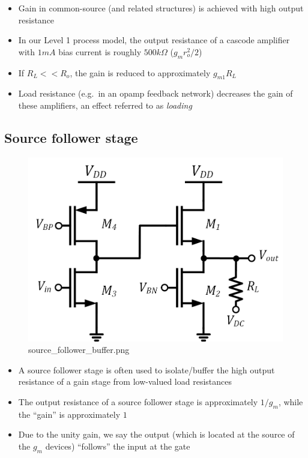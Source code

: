 \documentclass[11pt]{article}
\begin{document}
    \begin{itemize}
\item
  Gain in common-source (and related structures) is achieved with high
  output resistance
\item
  In our Level 1 process model, the output resistance of a cascode
  amplifier with \(1mA\) bias current is roughly \(500k\Omega\)
  (\(g_m r_o^2/2\))
\item
  If \(R_L << R_o\), the gain is reduced to approximately \(g_{m1}R_L\)
\item
  Load resistance (e.g.~in an opamp feedback network) decreases the gain
  of these amplifiers, an effect referred to as \emph{loading}
\end{itemize}

    \hypertarget{source-follower-stage}{%
\subsection{Source follower stage}\label{source-follower-stage}}

    \begin{figure}
\centering
\includegraphics{source_follower_buffer.png}
\caption{source\_follower\_buffer.png}
\end{figure}

    \begin{itemize}
\item
  A source follower stage is often used to isolate/buffer the high
  output resistance of a gain stage from low-valued load resistances
\item
  The output resistance of a source follower stage is approximately
  \(1/g_m\), while the ``gain'' is approximately \(1\)
\item
  Due to the unity gain, we say the output (which is located at the
  source of the \(g_m\) devices) ``follows'' the input at the gate
\end{itemize}
\end{document}
